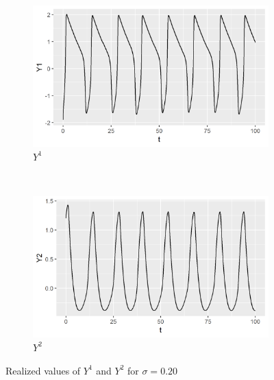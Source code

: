 \documentclass[a4paper]{article}
\begin{document}
\begin{figure}
    \centering
    \begin{subfigure}[b]{0.45\textwidth}
        \includegraphics[width=\textwidth]{part1a-sigma2-Y1.png}
        \caption{$Y^1$}
    \end{subfigure}
    ~
    \begin{subfigure}[b]{0.45\textwidth}
        \includegraphics[width=\textwidth]{part1a-sigma2-Y2.png}
        \caption{$Y^2$}
    \end{subfigure}
    \caption{Realized values of $Y^1$ and $Y^2$ for $\sigma = 0.20$}\label{fig:part1a-sigma2}
\end{figure}
\end{document}
